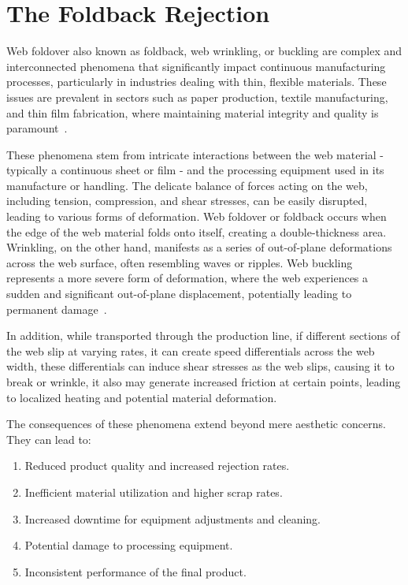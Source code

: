 \section{The Foldback Rejection}

Web foldover also known as foldback, web wrinkling, or buckling are complex and interconnected phenomena that significantly impact continuous manufacturing processes, particularly in industries dealing with thin, flexible materials. These issues are prevalent in sectors such as paper production, textile manufacturing, and thin film fabrication, where maintaining material integrity and quality is paramount~\cite{rosiumconference}.

These phenomena stem from intricate interactions between the web material - typically a continuous sheet or film - and the processing equipment used in its manufacture or handling. The delicate balance of forces acting on the web, including tension, compression, and shear stresses, can be easily disrupted, leading to various forms of deformation.
Web foldover or foldback occurs when the edge of the web material folds onto itself, creating a double-thickness area. Wrinkling, on the other hand, manifests as a series of out-of-plane deformations across the web surface, often resembling waves or ripples. Web buckling represents a more severe form of deformation, where the web experiences a sudden and significant out-of-plane displacement, potentially leading to permanent damage~\cite{Gehlbach1987WebWE}. 

In addition, while transported through the production line, if different sections of the web slip at varying rates, it can create speed differentials across the web width, these differentials can induce shear stresses as the web slips, causing it to break or wrinkle, it also may generate increased friction at certain points, leading to localized heating and potential material deformation. 

The consequences of these phenomena extend beyond mere aesthetic concerns. They can lead to:
\begin{enumerate}
    \item Reduced product quality and increased rejection rates.
    \item Inefficient material utilization and higher scrap rates.
    \item Increased downtime for equipment adjustments and cleaning.
    \item Potential damage to processing equipment.
    \item Inconsistent performance of the final product.
\end{enumerate}

